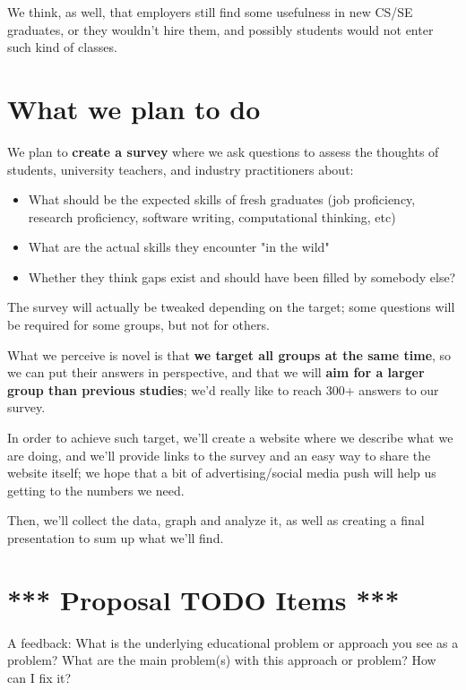 \documentclass{sigchi}
\begin{document}
 We think, as well, that employers still find some usefulness in new CS/SE graduates, or they wouldn't hire them, and possibly students would not enter such kind of classes.
 
 \section{What we plan to do}
 
 We plan to \textbf{create a survey} where we ask questions to assess the thoughts of students, university teachers, and industry practitioners about:
 \begin{itemize}
 	\item What should be the expected skills of fresh graduates (job proficiency, research proficiency, software writing, computational thinking, etc)
 	\item What are the actual skills they encounter "in the wild"
 	\item Whether they think gaps exist and should have been filled by somebody else?

 \end{itemize} 
 
 The survey will actually be tweaked depending on the target; some questions will be required for some groups, but not for others.
 
 What we perceive is novel is that \textbf{we target all groups at the same time}, so we can put their answers in perspective, and that we will \textbf{aim for a larger group than previous studies}; we'd really like to reach 300+ answers to our survey.
 
 In order to achieve such target, we'll create a website where we describe what we are doing, and we'll provide links to the survey and an easy way to share the website itself; we hope that a bit of advertising/social media push will help us getting to the numbers we need.
 
 Then, we'll collect the data, graph and analyze it, as well as creating a final presentation to sum up what we'll find.
   


\section{*** Proposal TODO Items ***} 

A feedback:
What is the underlying educational problem or approach you see as a problem?  What are the main problem(s) with this approach or problem?  How can I fix it?
\end{document}
